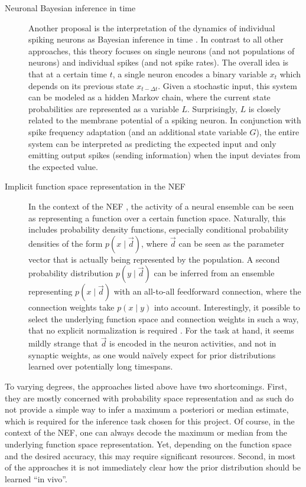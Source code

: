 \documentclass[a4paper,11pt]{article}
\begin{document}
\begin{description}
\item[Neuronal Bayesian inference in time]
Another proposal is the interpretation of the dynamics of individual spiking neurons as Bayesian inference in time \cite{deneve2008bayesian}. In contrast to all other approaches, this theory focuses on single neurons (and not populations of neurons) and individual spikes (and not spike rates). The overall idea is that at a certain time $t$, a single neuron encodes a binary variable $x_t$ which depends on its previous state $x_{t - \Delta t}$. Given a stochastic input, this system can be modeled as a hidden Markov chain, where the current state probabilities are represented as a variable $L$. Surprisingly, $L$ is closely related to the membrane potential of a spiking neuron. In conjunction with spike frequency adaptation (and an additional state variable $G$), the entire system can be interpreted as predicting the expected input and only emitting output spikes (sending information) when the input deviates from the expected value.

\item[Implicit function space representation in the NEF]
In the context of the NEF \cite{eliasmith2003neural}, the activity of a neural ensemble can be seen as representing a function over a certain function space. Naturally, this includes probability density functions, especially conditional probability densities of the form $p(x \mid \vec d)$, where $\vec d$ can be seen as the parameter vector that is actually being represented by the population. A second probability distribution $p(y \mid \vec d)$ can be inferred from an ensemble representing $p(x \mid \vec d)$ with an all-to-all feedforward connection, where the connection weights take $p(x \mid y)$ into account. Interestingly, it possible to select the underlying function space and connection weights in such a way, that no explicit normalization is required \cite{eliasmith2011normalization}. For the task at hand, it seems mildly strange that $\vec d$ is encoded in the neuron activities, and not in synaptic weights, as one would na\"ively expect for prior distributions learned over potentially long timespans.
\end{description}

To varying degrees, the approaches listed above have two shortcomings. First, they are mostly concerned with probability space representation and as such do not provide a simple way to infer a maximum a posteriori or median estimate, which is required for the inference task chosen for this project. Of course, in the context of the NEF, one can always decode the maximum or median from the underlying function space representation. Yet, depending on the function space and the desired accuracy, this may require significant resources. Second, in most of the approaches it is not immediately clear how the prior distribution should be learned \enquote{in vivo}.
\end{document}
